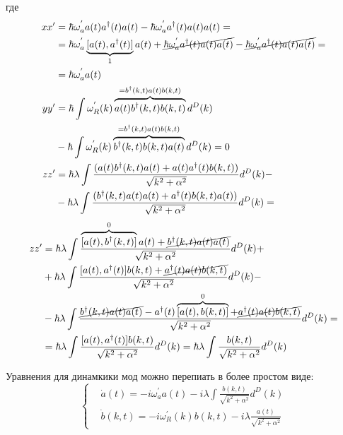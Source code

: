 где
\begin{equation}\notag
    \begin{split}
        xx' & = \hbar \omega^{'}_a a(t) a^{\dagger}(t) a(t) - \hbar \omega^{'}_a a^{\dagger}(t) a(t) a(t) = \\
        & = \hbar \omega^{'}_a \underbrace{[a(t), a^{\dagger}(t)]}_{1} a(t)
          + \cancel{\hbar \omega^{'}_a a^{\dagger}(t) a(t) a(t)}
          - \cancel{\hbar \omega^{'}_a a^{\dagger}(t) a(t) a(t)} = \\
        & = \hbar \omega^{'}_a a(t) \\
        yy' & = \hbar \int \omega^{'}_{R}(k) \overbrace{a(t) b^{\dagger}(k,t) b(k,t)}^{= b^{\dagger}(k,t) a(t) b(k,t)} d^{D}(k) \\
        & - \hbar \int \omega^{'}_{R}(k) \overbrace{b^{\dagger}(k,t) b(k,t) a(t)}^{= b^{\dagger}(k,t) a(t) b(k,t)} d^{D}(k) = 0 \\
        zz' & = \hbar \lambda \int \frac{(a(t) b^{\dagger}(k,t) a(t)
        + a(t) a^{\dagger}(t) b(k,t))}{\sqrt{k^{2} + \alpha^{2}}} d^{D}(k) - \\
        & - \hbar \lambda \int \frac{(b^{\dagger}(k,t) a(t) a(t)
        + a^{\dagger}(t) b(k,t) a(t))}{\sqrt{k^{2} + \alpha^{2}}} d^{D}(k) = \\
    \end{split}
\end{equation}
\begin{equation}\notag
    \begin{split}
        zz' & = \hbar \lambda \int \frac{\overbrace{[a(t), b^{\dagger}(k,t)]}^{0} a(t) + \cancel{b^{\dagger}(k,t) a(t) a(t)}}{\sqrt{k^{2} + \alpha^{2}}} d^{D}(k) + \\
        & + \hbar \lambda \int \frac{[a(t), a^{\dagger}(t)] b(k,t) + \cancel{a^{\dagger}(t) a(t) b(k,t)}}{\sqrt{k^{2} + \alpha^{2}}} d^{D}(k) - \\
        & - \hbar \lambda \int \frac{\cancel{b^{\dagger}(k,t) a(t) a(t)} - a^{\dagger}(t) \overbrace{[a(t), b(k,t)]}^{0} +
            \cancel{a^{\dagger}(t) a(t) b(k,t)} }{\sqrt{k^{2} + \alpha^{2}}} d^{D}(k) = \\
        & = \hbar \lambda \int \frac{[a(t), a^{\dagger}(t)] b(k,t)}{\sqrt{k^{2} + \alpha^{2}}} d^{D}(k) =
        \hbar \lambda \int \frac{b(k,t)}{\sqrt{k^{2} + \alpha^{2}}} d^{D}(k)
    \end{split}
\end{equation}

Уравнения для динамкики мод можно перепиать в более простом виде:
{\large
\begin{equation}
    \begin{cases}
        & \dot{a}(t) = -i \omega^{'}_a a(t) - i \lambda \int \frac{b(k,t)}{\sqrt{k^{2} + \alpha^{2}}} d^{D}(k) \\
        & \dot{b}(k,t) = -i \omega^{'}_{R}(k) b(k,t) -i \lambda \frac{a(t)}{\sqrt{k^{2} + \alpha^{2}}}
    \end{cases}
\end{equation}}

